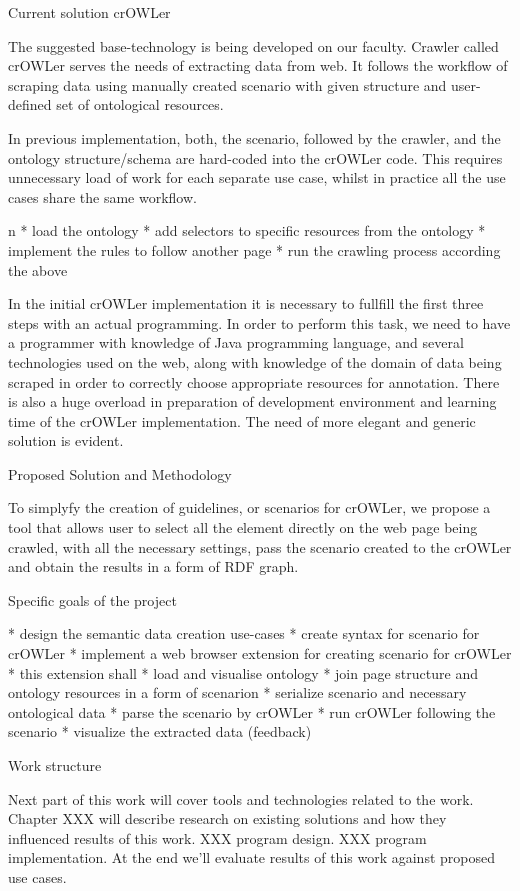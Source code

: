 \sec Current solution crOWLer

The suggested base-technology is being developed on our faculty. Crawler called
crOWLer serves the needs of extracting data from web. It follows the workflow
of scraping data using manually created scenario with given structure and
user-defined set of ontological resources. 

In previous implementation, both, the scenario, followed by the crawler, and
the ontology structure/schema are hard-coded into the crOWLer code. This
requires unnecessary load of work for each separate use case, whilst in
practice all the use cases share the same workflow. 

\begitems \style n
  * load the ontology
  * add selectors to specific resources from the ontology
  * implement the rules to follow another page
  * run the crawling process according the above
\enditems

In the initial crOWLer implementation it is necessary to fullfill the first
three steps with an actual programming. In order to perform this task, we need
to have a programmer with knowledge of Java programming language, and several
technologies used on the web, along with knowledge of the domain of data being
scraped in order to correctly choose appropriate resources for annotation.
There is also a huge overload in preparation of development environment and
learning time of the crOWLer implementation. The need of more elegant and
generic solution is evident. 


\sec Proposed Solution and Methodology

To simplyfy the creation of guidelines, or scenarios for crOWLer, we propose a
tool that allows user to select all the element directly on the web page being
crawled, with all the necessary settings, pass the scenario created to the
crOWLer and obtain the results in a form of RDF graph. 

\sec Specific goals of the project

\begitems
  * design the semantic data creation use-cases
  * create syntax for scenario for crOWLer 
  * implement a web browser extension for creating scenario for crOWLer
  * this extension shall
  \begitems
    * load and visualise ontology 
    * join page structure and ontology resources in a form of scenarion
    * serialize scenario and necessary ontological data
  \enditems
  * parse the scenario by crOWLer
  * run crOWLer following the scenario
  * visualize the extracted data (feedback)
\enditems


\sec Work structure

Next part of this work will cover tools and technologies related to the work.
Chapter XXX will describe research on existing solutions and how they
influenced results of this work. XXX program design. XXX program
implementation. At the end we'll evaluate results of this work against proposed
use cases. 


